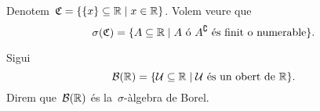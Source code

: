 \documentclass[../Apunts.tex]{subfiles}
\begin{document}
	\begin{example}
		\label{ex:sigma àlgebra de singletons}
		Denotem~\(\mathfrak{C}=\{\{x\}\subseteq\mathbb{R}\mid x\in\mathbb{R}\}\). Volem veure que
		\[\sigma(\mathfrak{C})=\{A\subseteq\mathbb{R}\mid A\text{ ó }A^{\complement}\text{ és finit o numerable}\}.\]
		\begin{solution}
		\end{solution}
	\end{example}
	\begin{definition}
		\label{def:sigma àlgebra de Borel}
		Sigui
		\[
			\mathcal{B}(\mathbb{R})=\{\mathcal{U}\subseteq\mathbb{R}\mid\mathcal{U}\text{ és un obert de }\mathbb{R}\}.
		\]
		Direm que~\(\mathcal{B}(\mathbb{R})\) és la~\(\sigma\)-àlgebra de Borel.
	\end{definition}
\end{document}

